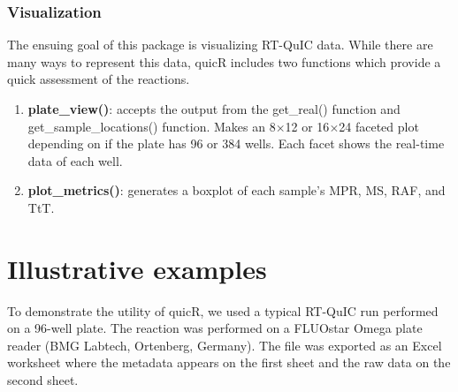 \documentclass[preprint,12pt,a4paper]{elsarticle}
\begin{document}
        \subsubsection{Visualization}
            The ensuing goal of this package is visualizing RT-QuIC data. While there are many ways to represent this data, quicR includes two functions which provide a quick assessment of the reactions.
            \begin{enumerate}
                \item \textbf{plate\_view()}: accepts the output from the get\_real() function and get\_sample\_locations() function. Makes an 8$\times$12 or 16$\times$24 faceted plot depending on if the plate has 96 or 384 wells. Each facet shows the real-time data of each well.
                \item \textbf{plot\_metrics()}: generates a boxplot of each sample's MPR, MS, RAF, and TtT.
            \end{enumerate}
        
    \section{Illustrative examples}


        To demonstrate the utility of quicR, we used a typical RT-QuIC run performed on a 96-well plate. The reaction was performed on a FLUOstar Omega plate reader (BMG Labtech, Ortenberg, Germany). The file was exported as an Excel worksheet where the metadata appears on the first sheet and the raw data on the second sheet.
        
\end{document}
